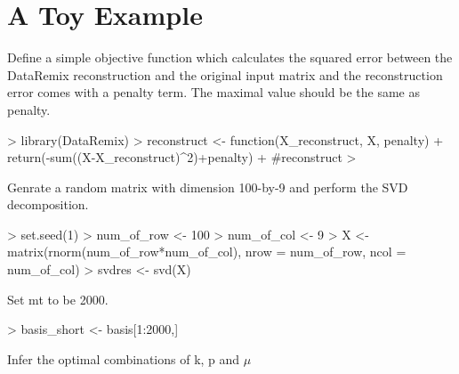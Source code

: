 \documentclass{article}
\begin{document}

\section{A Toy Example}
Define a simple objective function which calculates the squared error between the DataRemix reconstruction and the original input matrix and the reconstruction error comes with a penalty term. The maximal value should be the same as penalty.
\begin{Schunk}
\begin{Sinput}
> library(DataRemix)
> reconstruct <- function(X_reconstruct, X, penalty){
+   return(-sum((X-X_reconstruct)^2)+penalty)
+ }#reconstruct
> 
\end{Sinput}
\end{Schunk}
Genrate a random matrix with dimension 100-by-9 and perform the SVD decomposition.
\begin{Schunk}
\begin{Sinput}
> set.seed(1)
> num_of_row <- 100
> num_of_col <- 9
> X <- matrix(rnorm(num_of_row*num_of_col), nrow = num_of_row, ncol = num_of_col)
> svdres <- svd(X)
\end{Sinput}
\end{Schunk}
Set mt to be 2000.
\begin{Schunk}
\begin{Sinput}
> basis_short <- basis[1:2000,]
\end{Sinput}
\end{Schunk}
Infer the optimal combinations of k, p and $\mu$
\end{document}
